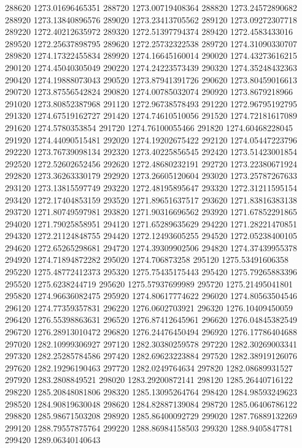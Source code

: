 {288620 1273.01696465351
288720 1273.00719408364
288820 1273.24572890682
288920 1273.13840896576
289020 1273.23413705562
289120 1273.09272307718
289220 1272.40212635972
289320 1272.51397794374
289420 1272.4583433016
289520 1272.25637898795
289620 1272.25732322538
289720 1274.31090330707
289820 1274.17322455834
289920 1274.16645160014
290020 1274.43273616215
290120 1274.45040305049
290220 1274.24223573439
290320 1274.35248432363
290420 1274.19888073043
290520 1273.87941391726
290620 1273.80459016613
290720 1273.87556542824
290820 1274.00785032074
290920 1273.8679218966
291020 1273.80852387968
291120 1272.96738578493
291220 1272.96795192795
291320 1274.67519162727
291420 1274.74610510056
291520 1274.72181617089
291620 1274.5780353854
291720 1274.76100055466
291820 1274.60468228045
291920 1274.44090515481
292020 1274.19202675422
292120 1274.05447223796
292220 1273.76739098134
292320 1273.40225856545
292420 1273.51423001854
292520 1272.52602652456
292620 1272.48680232191
292720 1273.22380671924
292820 1273.36263330179
292920 1273.26605120604
293020 1273.25787267633
293120 1273.13815597749
293220 1272.48195895647
293320 1272.31211595154
293420 1272.17404853159
293520 1271.89651637517
293620 1271.83816383138
293720 1271.80749597981
293820 1271.90316696562
293920 1271.67852291865
294020 1271.79025858951
294120 1271.65289635629
294220 1271.28221470851
294320 1272.21124848755
294420 1272.12493605255
294520 1272.05238400105
294620 1272.65265298681
294720 1274.39309902506
294820 1274.37439955378
294920 1274.71894872282
295020 1274.706873258
295120 1275.53491606358
295220 1275.48772412373
295320 1275.75435175443
295420 1275.79265883396
295520 1275.6238244719
295620 1275.57937699989
295720 1275.21495041801
295820 1274.96636082475
295920 1274.80617774622
296020 1274.80563504546
296120 1274.77359357831
296220 1276.0602703921
296320 1276.10409450059
296420 1276.55398863631
296520 1276.87412645961
296620 1276.04845382549
296720 1276.28913010472
296820 1276.24476450494
296920 1276.17786404688
297020 1282.10999306927
297120 1282.30380259578
297220 1282.30269003341
297320 1282.25285784586
297420 1282.69623223884
297520 1282.38919126076
297620 1282.19296190463
297720 1282.0249764634
297820 1282.08689931527
297920 1283.2808849521
298020 1283.29200872141
298120 1285.26440716122
298220 1285.20848081806
298320 1285.13095264764
298420 1284.98593249623
298520 1284.90819630048
298620 1284.82887139084
298720 1285.06406786122
298820 1285.98671503208
298920 1285.86400092729
299020 1287.76889132269
299120 1288.79557875764
299220 1288.86984158503
299320 1288.9405847781
299420 1289.06340140643
}
